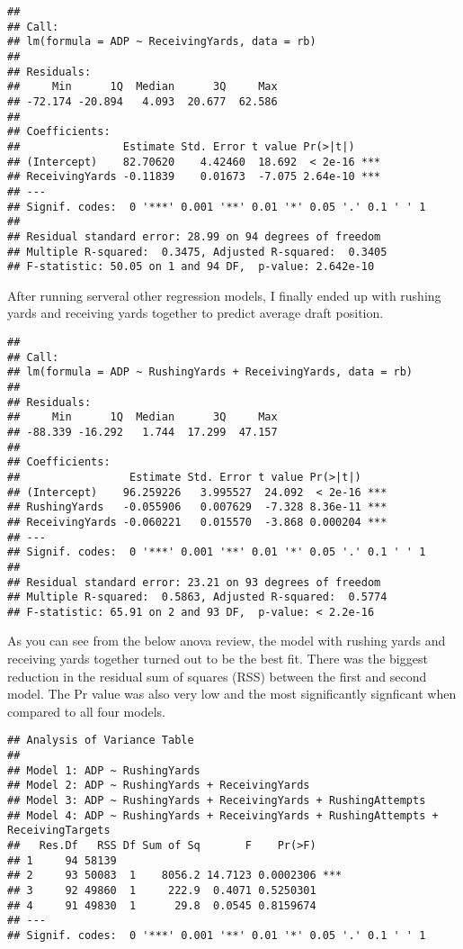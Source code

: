 \documentclass[]{article}
\begin{document}
\begin{verbatim}
## 
## Call:
## lm(formula = ADP ~ ReceivingYards, data = rb)
## 
## Residuals:
##     Min      1Q  Median      3Q     Max 
## -72.174 -20.894   4.093  20.677  62.586 
## 
## Coefficients:
##                Estimate Std. Error t value Pr(>|t|)    
## (Intercept)    82.70620    4.42460  18.692  < 2e-16 ***
## ReceivingYards -0.11839    0.01673  -7.075 2.64e-10 ***
## ---
## Signif. codes:  0 '***' 0.001 '**' 0.01 '*' 0.05 '.' 0.1 ' ' 1
## 
## Residual standard error: 28.99 on 94 degrees of freedom
## Multiple R-squared:  0.3475, Adjusted R-squared:  0.3405 
## F-statistic: 50.05 on 1 and 94 DF,  p-value: 2.642e-10
\end{verbatim}

After running serveral other regression models, I finally ended up with
rushing yards and receiving yards together to predict average draft
position.

\begin{verbatim}
## 
## Call:
## lm(formula = ADP ~ RushingYards + ReceivingYards, data = rb)
## 
## Residuals:
##     Min      1Q  Median      3Q     Max 
## -88.339 -16.292   1.744  17.299  47.157 
## 
## Coefficients:
##                 Estimate Std. Error t value Pr(>|t|)    
## (Intercept)    96.259226   3.995527  24.092  < 2e-16 ***
## RushingYards   -0.055906   0.007629  -7.328 8.36e-11 ***
## ReceivingYards -0.060221   0.015570  -3.868 0.000204 ***
## ---
## Signif. codes:  0 '***' 0.001 '**' 0.01 '*' 0.05 '.' 0.1 ' ' 1
## 
## Residual standard error: 23.21 on 93 degrees of freedom
## Multiple R-squared:  0.5863, Adjusted R-squared:  0.5774 
## F-statistic: 65.91 on 2 and 93 DF,  p-value: < 2.2e-16
\end{verbatim}

As you can see from the below anova review, the model with rushing yards
and receiving yards together turned out to be the best fit. There was
the biggest reduction in the residual sum of squares (RSS) between the
first and second model. The Pr value was also very low and the most
significantly signficant when compared to all four models.

\begin{verbatim}
## Analysis of Variance Table
## 
## Model 1: ADP ~ RushingYards
## Model 2: ADP ~ RushingYards + ReceivingYards
## Model 3: ADP ~ RushingYards + ReceivingYards + RushingAttempts
## Model 4: ADP ~ RushingYards + ReceivingYards + RushingAttempts + ReceivingTargets
##   Res.Df   RSS Df Sum of Sq       F    Pr(>F)    
## 1     94 58139                                   
## 2     93 50083  1    8056.2 14.7123 0.0002306 ***
## 3     92 49860  1     222.9  0.4071 0.5250301    
## 4     91 49830  1      29.8  0.0545 0.8159674    
## ---
## Signif. codes:  0 '***' 0.001 '**' 0.01 '*' 0.05 '.' 0.1 ' ' 1
\end{verbatim}
\end{document}
